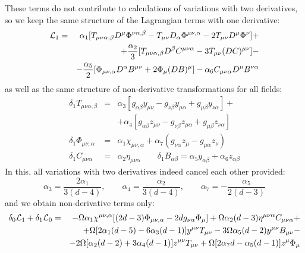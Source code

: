 \documentclass[a4paper,12pt]{article}
\begin{document}
These terms do not contribute to calculations of variations with two
derivatives, so we keep the same structure of the Lagrangian terms
with one derivative:
\begin{eqnarray}
{\cal L}_1 &=& \alpha_1 [ T_{\mu\nu\alpha,\beta} D^\mu
\Phi^{\nu\alpha,\beta} - T_{\mu\nu} D_\alpha \Phi^{\mu\nu,\alpha}
- 2 T_{\mu\nu} D^\mu \Phi^\nu ] + \nonumber \\
 && + \frac{\alpha_2}{3} [ T_{\mu\nu\alpha,\beta} D^\beta
 C^{\mu\nu\alpha} - 3 T_{\mu\nu} (D C)^{\mu\nu} ] - \nonumber \\
 && - \frac{\alpha_5}{2} [ \Phi_{\mu\nu,\alpha} D^\alpha
 B^{\mu\nu} + 2 \Phi_\mu (D B)^\mu ] - \alpha_6 C_{\mu\nu\alpha}
 D^\mu B^{\nu\alpha}
\end{eqnarray}
as well as the same structure of non-derivative transformations for
all fields:
\begin{eqnarray}
\delta_1 T_{\mu\nu\alpha,\beta} &=& \alpha_3 [ g_{\alpha\beta} y_{\mu\nu}
- g_{\nu\beta} y_{\mu\alpha} + g_{\mu\beta} y_{\nu\alpha} ] +
\nonumber \\
 && + \alpha_4 [ g_{\alpha\beta} z_{\mu\nu}
- g_{\nu\beta} z_{\mu\alpha} + g_{\mu\beta} z_{\nu\alpha} ] \nonumber \\
\delta_1 \Phi_{\mu\nu,\alpha} &=& \alpha_1 \chi_{\mu\nu,\alpha} + \alpha_7
(g_{\nu\alpha} z_\mu - g_{\mu\alpha} z_\nu) \\
\delta_1 C_{\mu\nu\alpha} &=& \alpha_2 \eta_{\mu\nu\alpha} \qquad
\delta_1 B_{\alpha\beta} = \alpha_5 y_{\alpha\beta} + \alpha_6 z_{\alpha\beta}
\nonumber
\end{eqnarray}
In this, all variations with two derivatives indeed cancel each other
provided:
$$
\alpha_3 = \frac{2\alpha_1}{3(d-4)}, \qquad \alpha_4 = \frac{\alpha_2}{3(d-4)},
\qquad \alpha_7 = - \frac{\alpha_5}{2(d-3)}
$$
and we obtain non-derivative terms only:
\begin{eqnarray}
\delta_0 {\cal L}_1 + \delta_1 {\cal L}_0 &=& - \Omega \alpha_1
\chi^{\mu\nu,\alpha} [ (2d-3) \Phi_{\mu\nu,\alpha} - 2 d
g_{\nu\alpha} \Phi_\mu ] + \Omega \alpha_2 (d-3) \eta^{\mu\nu\alpha}
C_{\mu\nu\alpha} + \nonumber \\
 && + \Omega [ 2 \alpha_1 (d-5) - 6 \alpha_3 (d-1)] y^{\mu\nu}
 T_{\mu\nu} - 3 \Omega \alpha_5 (d-2) y^{\mu\nu} B_{\mu\nu} -
 \nonumber \\
 && - 2 \Omega [ \alpha_2 (d-2) + 3 \alpha_4 (d-1)] z^{\mu\nu}
 T_{\mu\nu} + \Omega [2 \alpha_7 d - \alpha_5 (d-1)] z^\mu \Phi_\mu
\end{eqnarray}
\end{document}
